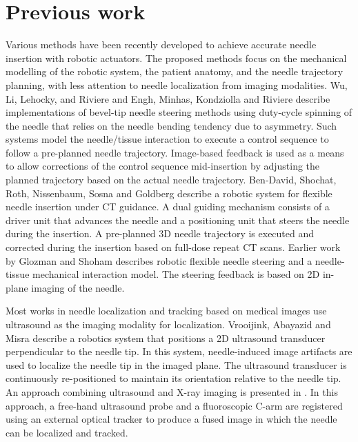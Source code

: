 \section*{Previous work}
Various methods have been recently developed to achieve accurate needle insertion with robotic actuators. The proposed methods focus on the mechanical modelling of the robotic system, the patient anatomy, and the needle trajectory planning, with less attention to needle localization from imaging modalities.
Wu, Li, Lehocky, and Riviere \cite{wu2013automatic} and Engh, Minhas, Kondziolla and Riviere \cite{engh2010percutaneous} describe implementations of bevel-tip needle steering methods using duty-cycle spinning of the needle that relies on the needle bending tendency due to asymmetry. Such systems model the needle/tissue interaction to execute a control sequence to follow a pre-planned needle trajectory. Image-based feedback is used as a means to allow corrections of the control sequence mid-insertion by adjusting the planned trajectory based on the actual needle trajectory.
Ben-David, Shochat, Roth, Nissenbaum, Sosna and Goldberg \cite{ben2018robotic} describe a robotic system for flexible needle insertion under CT guidance. A dual guiding mechanism consists of a driver unit that advances the needle and a positioning unit that steers the needle during the insertion. A pre-planned 3D needle trajectory is executed and corrected during the insertion based on full-dose repeat CT scans.
Earlier work by Glozman and Shoham \cite{glozman2007image} describes robotic flexible needle steering and a needle-tissue mechanical interaction model. The steering feedback is based on 2D in-plane imaging of the needle.

Most works in needle localization and tracking based on medical images use ultrasound as the imaging modality for localization. Vrooijink, Abayazid and Misra \cite{vrooijink2013real} describe a robotics system that positions a 2D ultrasound transducer perpendicular to the needle tip. In this system, needle-induced image artifacts are used to localize the needle tip in the imaged plane. The ultrasound transducer is continuously re-positioned to maintain its orientation relative to the needle tip. An approach combining ultrasound and X-ray imaging is presented in \cite{marinetto2017integration}. In this approach, a free-hand ultrasound probe and a fluoroscopic C-arm are registered using an external optical tracker to produce a fused image in which the needle can be localized and tracked.

